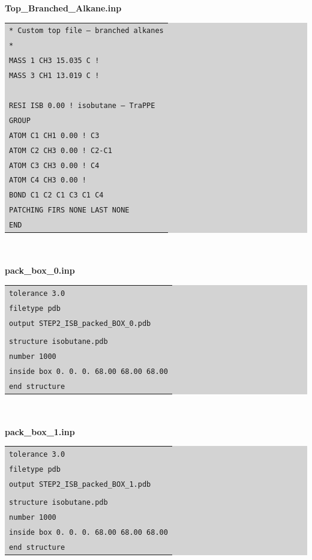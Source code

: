 \newline
\textbf{Top\_Branched\_Alkane.inp}\\
\colorbox{lightgray}{
\begin{tabular}{l}
\texttt{* Custom top file -- branched alkanes}\\
\texttt{*}\\
\texttt{MASS   1  CH3    15.035 C  !}\\
\texttt{MASS   3  CH1    13.019 C  !}\\
\texttt{ }\\
\texttt{RESI ISB        0.00 ! isobutane – TraPPE}\\
\texttt{GROUP}\\
\texttt{ATOM C1 CH1     0.00 !      C3}\\
\texttt{ATOM C2 CH3     0.00 ! C2-C1}\\
\texttt{ATOM C3 CH3     0.00 !      C4}\\
\texttt{ATOM C4 CH3     0.00 !}\\
\texttt{BOND C1 C2 C1 C3 C1 C4}\\
\texttt{PATCHING FIRS NONE LAST NONE}\\
\texttt{END}\\
\end{tabular}}\\\\
\newline
\textbf{pack\_box\_0.inp}\\
\colorbox{lightgray}{
\begin{tabular}{l}
\texttt{tolerance 3.0}\\
\texttt{filetype pdb}\\
\texttt{output STEP2\_ISB\_packed\_BOX\_0.pdb}\\
\texttt{}\\
\texttt{structure isobutane.pdb}\\
\texttt{number 1000 }\\
\texttt{inside box 0. 0. 0. 68.00 68.00 68.00}\\
\texttt{end structure}\\
\end{tabular}}\\\\
\newline
\textbf{pack\_box\_1.inp}\\
\colorbox{lightgray}{
\begin{tabular}{l}
\texttt{tolerance 3.0}\\
\texttt{filetype pdb}\\
\texttt{output STEP2\_ISB\_packed\_BOX\_1.pdb}\\
\texttt{}\\
\texttt{structure isobutane.pdb}\\
\texttt{number 1000 }\\
\texttt{inside box 0. 0. 0. 68.00 68.00 68.00}\\
\texttt{end structure}\\
\end{tabular}}\\\\
